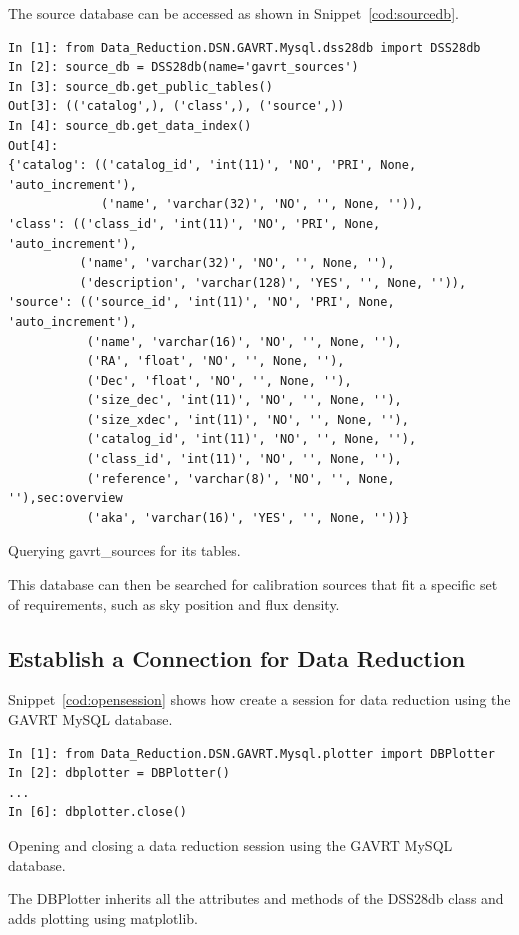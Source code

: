 \documentclass[letterpaper,11pt]{report}
\begin{document}
The source database can be accessed as shown in Snippet~\ref{cod:sourcedb}.
\begin{code}[h!tb]
    \begin{center}
        {\footnotesize \begin{verbatim}
In [1]: from Data_Reduction.DSN.GAVRT.Mysql.dss28db import DSS28db
In [2]: source_db = DSS28db(name='gavrt_sources')
In [3]: source_db.get_public_tables()
Out[3]: (('catalog',), ('class',), ('source',))
In [4]: source_db.get_data_index()
Out[4]: 
{'catalog': (('catalog_id', 'int(11)', 'NO', 'PRI', None, 'auto_increment'),
             ('name', 'varchar(32)', 'NO', '', None, '')),
'class': (('class_id', 'int(11)', 'NO', 'PRI', None, 'auto_increment'),
          ('name', 'varchar(32)', 'NO', '', None, ''),
          ('description', 'varchar(128)', 'YES', '', None, '')),
'source': (('source_id', 'int(11)', 'NO', 'PRI', None, 'auto_increment'),
           ('name', 'varchar(16)', 'NO', '', None, ''),
           ('RA', 'float', 'NO', '', None, ''),
           ('Dec', 'float', 'NO', '', None, ''),
           ('size_dec', 'int(11)', 'NO', '', None, ''),
           ('size_xdec', 'int(11)', 'NO', '', None, ''),
           ('catalog_id', 'int(11)', 'NO', '', None, ''),
           ('class_id', 'int(11)', 'NO', '', None, ''),
           ('reference', 'varchar(8)', 'NO', '', None, ''),sec:overview
           ('aka', 'varchar(16)', 'YES', '', None, ''))}\end{verbatim}
        }\caption{\label{cod:sourcedb}Querying {\ttfamily gavrt\_sources} for
        its tables.}
    \end{center}
\end{code}
This database can then be searched for calibration sources that fit a specific
set of requirements, such as sky position and flux density.

\subsection{Establish a Connection for Data Reduction}

Snippet~\ref{cod:opensession} shows how create a session for data reduction 
using the GAVRT MySQL database.
\begin{code}[h!tb]
    \begin{center}
{\small \begin{verbatim}
In [1]: from Data_Reduction.DSN.GAVRT.Mysql.plotter import DBPlotter
In [2]: dbplotter = DBPlotter()
...
In [6]: dbplotter.close()
\end{verbatim}
    }\caption{\label{cod:opensession}Opening and closing a data reduction 
    session using the GAVRT MySQL database.}
\end{center}
\end{code}
The {\ttfamily DBPlotter} inherits all the attributes and methods of the
{\ttfamily DSS28db} class and adds plotting using {\ttfamily matplotlib}.
\end{document}
